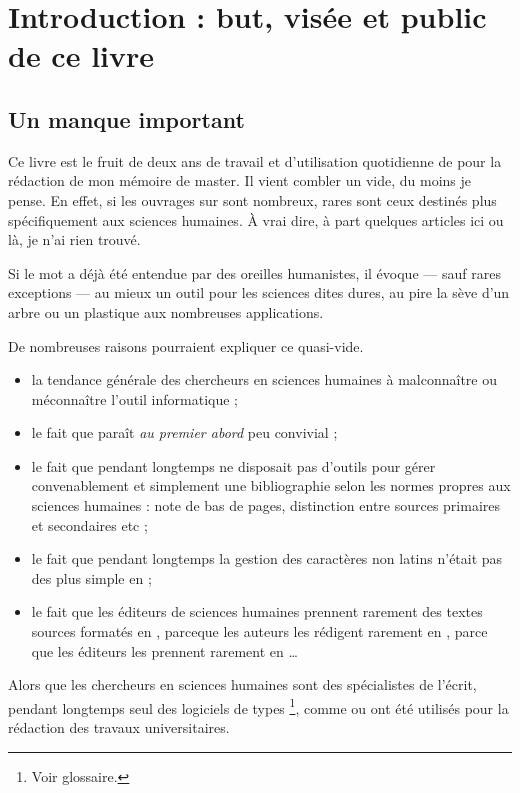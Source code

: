 \chapter{Introduction : but, visée et public de ce livre}
\section{Un manque important}

Ce livre est le fruit de deux ans de travail et d'utilisation quotidienne de \logiciel{\LaTeX} pour la rédaction de mon mémoire de master. Il vient combler un vide, du moins je pense. En effet, si les ouvrages sur \logiciel{\LaTeX} sont nombreux, rares sont ceux destinés plus spécifiquement aux sciences humaines. À vrai dire, à part quelques articles ici ou là, je n'ai rien trouvé.


Si le mot \logiciel{\LaTeX} a déjà été entendue par des oreilles humanistes, il évoque --- sauf rares exceptions --- au mieux un outil pour les sciences dites dures, au pire la sève d'un arbre ou un plastique aux nombreuses applications. 

De nombreuses raisons pourraient expliquer ce quasi-vide.
\begin{itemize}
\item la tendance générale des chercheurs en sciences humaines à malconnaître ou méconnaître l'outil informatique ;
\item le fait que \logiciel{\LaTeX} paraît \emph{au premier abord} peu convivial ;
\item le fait que pendant longtemps \logiciel{\LaTeX} ne disposait pas d'outils pour gérer convenablement et simplement une bibliographie selon les normes propres aux sciences humaines : note de bas de pages, distinction entre sources primaires et secondaires etc ;
\item le fait que pendant longtemps la gestion des caractères non latins n'était pas des plus simple en \logiciel{\LaTeX} ;
\item le fait que les éditeurs de sciences humaines prennent rarement des textes sources formatés en \logiciel{\LaTeX}, parceque les auteurs les rédigent rarement en \logiciel{\LaTeX}, parce que les éditeurs les prennent rarement en \logiciel{\LaTeX} \ldots
\end{itemize}

Alors que les chercheurs en sciences humaines sont des spécialistes de l'écrit, pendant longtemps seul des logiciels de types \footnote{Voir glossaire.}, comme  ou  ont été utilisés pour la rédaction des travaux universitaires.

